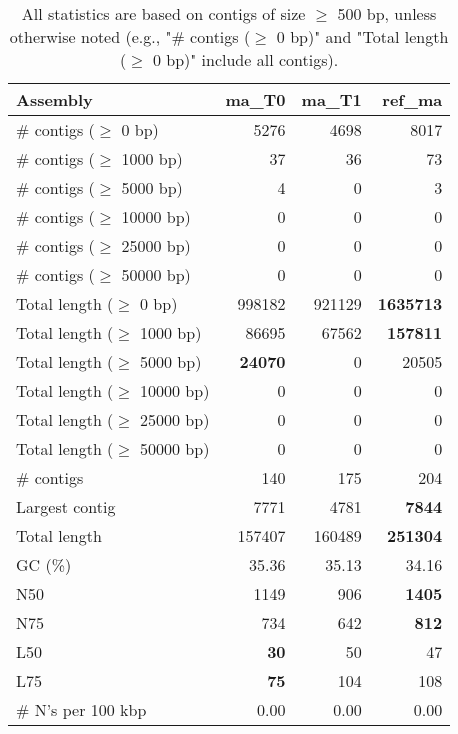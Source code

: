 \documentclass[12pt,a4paper]{article}
\begin{document}
\begin{table}[ht]
\begin{center}
\caption{All statistics are based on contigs of size $\geq$ 500 bp, unless otherwise noted (e.g., "\# contigs ($\geq$ 0 bp)" and "Total length ($\geq$ 0 bp)" include all contigs).}
\begin{tabular}{|l*{3}{|r}|}
\hline
Assembly & ma\_T0 & ma\_T1 & ref\_ma \\ \hline
\# contigs ($\geq$ 0 bp) & 5276 & 4698 & 8017 \\ \hline
\# contigs ($\geq$ 1000 bp) & 37 & 36 & 73 \\ \hline
\# contigs ($\geq$ 5000 bp) & 4 & 0 & 3 \\ \hline
\# contigs ($\geq$ 10000 bp) & 0 & 0 & 0 \\ \hline
\# contigs ($\geq$ 25000 bp) & 0 & 0 & 0 \\ \hline
\# contigs ($\geq$ 50000 bp) & 0 & 0 & 0 \\ \hline
Total length ($\geq$ 0 bp) & 998182 & 921129 & {\bf 1635713} \\ \hline
Total length ($\geq$ 1000 bp) & 86695 & 67562 & {\bf 157811} \\ \hline
Total length ($\geq$ 5000 bp) & {\bf 24070} & 0 & 20505 \\ \hline
Total length ($\geq$ 10000 bp) & 0 & 0 & 0 \\ \hline
Total length ($\geq$ 25000 bp) & 0 & 0 & 0 \\ \hline
Total length ($\geq$ 50000 bp) & 0 & 0 & 0 \\ \hline
\# contigs & 140 & 175 & 204 \\ \hline
Largest contig & 7771 & 4781 & {\bf 7844} \\ \hline
Total length & 157407 & 160489 & {\bf 251304} \\ \hline
GC (\%) & 35.36 & 35.13 & 34.16 \\ \hline
N50 & 1149 & 906 & {\bf 1405} \\ \hline
N75 & 734 & 642 & {\bf 812} \\ \hline
L50 & {\bf 30} & 50 & 47 \\ \hline
L75 & {\bf 75} & 104 & 108 \\ \hline
\# N's per 100 kbp & 0.00 & 0.00 & 0.00 \\ \hline
\end{tabular}
\end{center}
\end{table}
\end{document}
